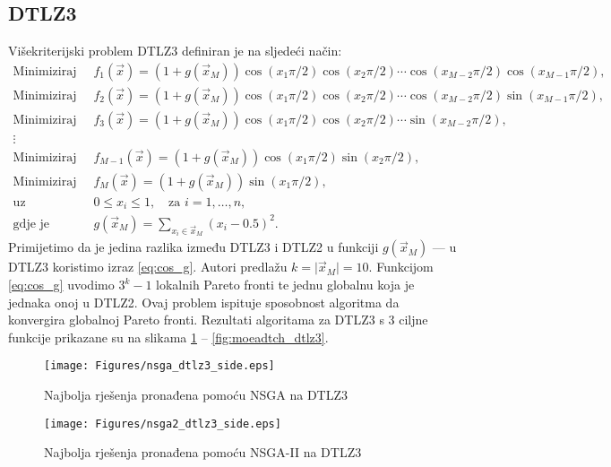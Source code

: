 \documentclass[times, utf8, zavrsni, numeric]{fer}
\begin{document}
\subsection{DTLZ3} 
Višekriterijski problem DTLZ3 definiran je na sljedeći način:
\begin{align*}
\mbox{Minimiziraj }\: &f_1(\vec{x}) = (1 + g(\vec{x}_M))\cos{(x_1\pi/2)}\cos{(x_2\pi/2)}\cdots\cos{(x_{M - 2}\pi/2)}\cos{(x_{M - 1}\pi/2)},\\
\mbox{Minimiziraj }\: &f_2(\vec{x}) = (1 + g(\vec{x}_M))\cos{(x_1\pi/2)}\cos{(x_2\pi/2)}\cdots\cos{(x_{M - 2}\pi/2)}\sin{(x_{M - 1}\pi/2)},\\
\mbox{Minimiziraj }\: &f_3(\vec{x}) = (1 + g(\vec{x}_M))\cos{(x_1\pi/2)}\cos{(x_2\pi/2)}\cdots\sin{(x_{M - 2}\pi/2)},\\
\vdots\\
\mbox{Minimiziraj }\: &f_{M-1}(\vec{x}) = (1 + g(\vec{x}_M))\cos{(x_1\pi/2)}\sin{(x_2\pi/2)},\\
\mbox{Minimiziraj }\: &f_{M}(\vec{x}) = (1 + g(\vec{x}_M))\sin{(x_1\pi/2)},\\
\mbox{uz ograničenja }\: &0 \leq x_i \leq 1, \quad \text{za } i = 1,\dots, n,\\
\mbox{gdje je }\: &g(\vec{x}_M) = \sum_{x_i \in \vec{x}_M}{(x_i - 0.5)^2}.
\end{align*}
Primijetimo da je jedina razlika između DTLZ3 i DTLZ2 u funkciji $g(\vec{x}_M)$ --- u DTLZ3 koristimo izraz \ref{eq:cos_g}. Autori predlažu $k = \vert\vec{x}_M\vert = 10$. Funkcijom \ref{eq:cos_g} uvodimo $3^k - 1$ lokalnih Pareto fronti te jednu globalnu koja je jednaka onoj u DTLZ2. Ovaj problem ispituje sposobnost algoritma da konvergira globalnoj Pareto fronti. Rezultati algoritama za DTLZ3 s 3 ciljne funkcije prikazane su na slikama \ref{fig:nsga_dtlz3} -- \ref{fig:moeadtch_dtlz3}.\\

\begin{figure}[htb]
\centering
\texttt{[image: Figures/nsga\_dtlz3\_side.eps]}
\caption{Najbolja rješenja pronađena pomoću NSGA na DTLZ3}
\label{fig:nsga_dtlz3}
\end{figure}

\begin{figure}[htb]
\centering
\texttt{[image: Figures/nsga2\_dtlz3\_side.eps]}
\caption{Najbolja rješenja pronađena pomoću NSGA-II na DTLZ3}
\label{fig:nsgaii_dtlz3}
\end{figure}
\end{document}
